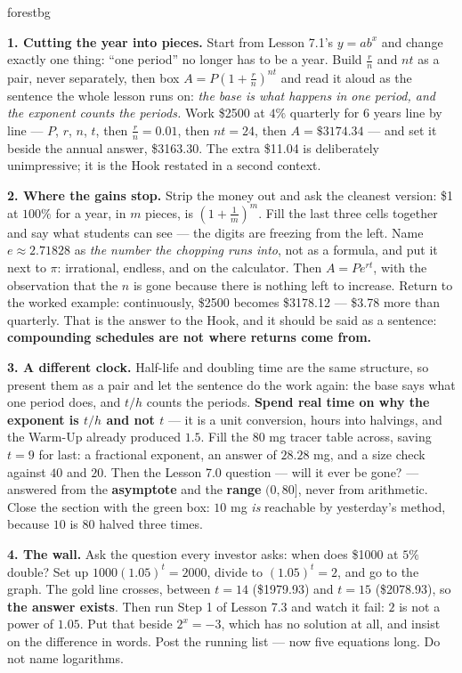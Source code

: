 \documentclass[10pt]{article}
\begin{document}
\begin{skillbox}[Lesson]{forestbg}
\begin{multicols}{2}
\textbf{1. Cutting the year into pieces.} Start from Lesson 7.1's $y=ab^{x}$ and change exactly one
thing: ``one period'' no longer has to be a year. Build $\frac{r}{n}$ and $nt$ as a pair, never
separately, then box $A=P\left(1+\frac{r}{n}\right)^{nt}$ and read it aloud as the sentence the whole
lesson runs on: \emph{the base is what happens in one period, and the exponent counts the periods.}
Work \$2500 at $4\%$ quarterly for 6 years line by line --- $P$, $r$, $n$, $t$, then $\frac{r}{n}=0.01$,
then $nt=24$, then $A=\$3174.34$ --- and set it beside the annual answer, \$3163.30. The extra \$11.04
is deliberately unimpressive; it is the Hook restated in a second context.

\textbf{2. Where the gains stop.} Strip the money out and ask the cleanest version: \$1 at $100\%$ for
a year, in $m$ pieces, is $\left(1+\frac1m\right)^{m}$. Fill the last three cells together and say what
students can see --- the digits are freezing from the left. Name $e\approx2.71828$ as \emph{the number
the chopping runs into}, not as a formula, and put it next to $\pi$: irrational, endless, and on the
calculator. Then $A=Pe^{rt}$, with the observation that the $n$ is gone because there is nothing left to
increase. Return to the worked example: continuously, \$2500 becomes \$3178.12 --- \$3.78 more than
quarterly. That is the answer to the Hook, and it should be said as a sentence: \textbf{compounding
schedules are not where returns come from.}

\columnbreak

\textbf{3. A different clock.} Half-life and doubling time are the same structure, so present them as
a pair and let the sentence do the work again: the base says what one period does, and $t/h$ counts the
periods. \textbf{Spend real time on why the exponent is $t/h$ and not $t$} --- it is a unit conversion,
hours into halvings, and the Warm-Up already produced $1.5$. Fill the 80 mg tracer table across, saving
$t=9$ for last: a fractional exponent, an answer of $28.28$ mg, and a size check against $40$ and $20$.
Then the Lesson 7.0 question --- will it ever be gone? --- answered from the \textbf{asymptote} and the
\textbf{range} $(0,80]$, never from arithmetic. Close the section with the green box: $10$ mg \emph{is}
reachable by yesterday's method, because $10$ is $80$ halved three times.

\textbf{4. The wall.} Ask the question every investor asks: when does \$1000 at $5\%$ double? Set up
$1000(1.05)^{t}=2000$, divide to $(1.05)^{t}=2$, and go to the graph. The gold line crosses, between
$t=14$ (\$1979.93) and $t=15$ (\$2078.93), so \textbf{the answer exists}. Then run Step 1 of Lesson 7.3
and watch it fail: $2$ is not a power of $1.05$. Put that beside $2^{x}=-3$, which has no solution at
all, and insist on the difference in words. Post the running list --- now five equations long. Do not
name logarithms.
\end{multicols}
\end{skillbox}
\end{document}
